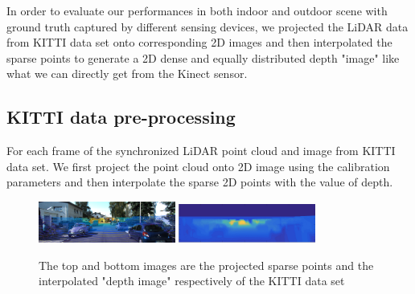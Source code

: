 \documentclass[letterpaper, 10 pt, conference]{ieeeconf}
\begin{document}
In order to evaluate our performances in both indoor and outdoor scene with ground truth captured by different sensing devices, we projected the LiDAR data from KITTI data set onto corresponding 2D images and then interpolated the sparse points to generate a 2D dense and equally distributed depth "image" like what we can directly get from the Kinect sensor.
\subsection{KITTI data pre-processing}
For each frame of the synchronized LiDAR point cloud and image from KITTI data set. We first project the point cloud onto 2D image using the calibration parameters and then interpolate the sparse 2D points with the value of depth.
\begin{figure}
\centering
\includegraphics[width=0.4\textwidth]{KITTI0_projection.png}
\includegraphics[width=0.4\textwidth]{KITTI0_interpolate.png}
\caption{\label{fig:kittioutput}The top and bottom images are the projected sparse points and the interpolated "depth image" respectively of the KITTI data set}
\end{figure}\\
\end{document}
